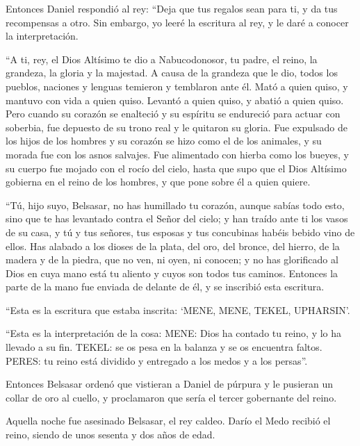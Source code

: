  Entonces Daniel respondió al rey: ``Deja que tus regalos
sean para ti, y da tus recompensas a otro. Sin embargo, yo leeré la
escritura al rey, y le daré a conocer la interpretación.

 ``A ti, rey, el Dios Altísimo te dio a Nabucodonosor, tu
padre, el reino, la grandeza, la gloria y la majestad.  A
causa de la grandeza que le dio, todos los pueblos, naciones y lenguas
temieron y temblaron ante él. Mató a quien quiso, y mantuvo con vida a
quien quiso. Levantó a quien quiso, y abatió a quien quiso.
 Pero cuando su corazón se enalteció y su espíritu se
endureció para actuar con soberbia, fue depuesto de su trono real y le
quitaron su gloria.  Fue expulsado de los hijos de los
hombres y su corazón se hizo como el de los animales, y su morada fue
con los asnos salvajes. Fue alimentado con hierba como los bueyes, y su
cuerpo fue mojado con el rocío del cielo, hasta que supo que el Dios
Altísimo gobierna en el reino de los hombres, y que pone sobre él a
quien quiere.

 ``Tú, hijo suyo, Belsasar, no has humillado tu corazón,
aunque sabías todo esto,  sino que te has levantado
contra el Señor del cielo; y han traído ante ti los vasos de su casa, y
tú y tus señores, tus esposas y tus concubinas habéis bebido vino de
ellos. Has alabado a los dioses de la plata, del oro, del bronce, del
hierro, de la madera y de la piedra, que no ven, ni oyen, ni conocen; y
no has glorificado al Dios en cuya mano está tu aliento y cuyos son
todos tus caminos.  Entonces la parte de la mano fue
enviada de delante de él, y se inscribió esta escritura.

 ``Esta es la escritura que estaba inscrita: `MENE, MENE,
TEKEL, UPHARSIN'.

 ``Esta es la interpretación de la cosa: MENE: Dios ha
contado tu reino, y lo ha llevado a su fin.  TEKEL: se os
pesa en la balanza y se os encuentra faltos.  PERES: tu
reino está dividido y entregado a los medos y a los persas''.

 Entonces Belsasar ordenó que vistieran a Daniel de
púrpura y le pusieran un collar de oro al cuello, y proclamaron que
sería el tercer gobernante del reino.

 Aquella noche fue asesinado Belsasar, el rey caldeo.
 Darío el Medo recibió el reino, siendo de unos sesenta y
dos años de edad.


